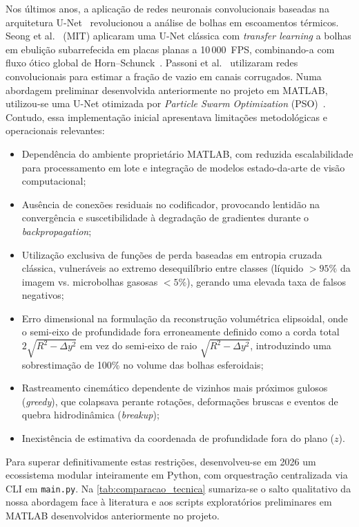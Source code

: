 Nos últimos anos, a aplicação de redes neuronais convolucionais baseadas na arquitetura U-Net~\cite{ronneberger2015unet} revolucionou a análise de bolhas em escoamentos térmicos. Seong et al.~\cite{seong2023automated} (MIT) aplicaram uma U-Net clássica com \emph{transfer learning} a bolhas em ebulição subarrefecida em placas planas a 10\,000~FPS, combinando-a com fluxo ótico global de Horn--Schunck~\cite{hornschunck1981}. Passoni et al.~\cite{passoni2024integrating} utilizaram redes convolucionais para estimar a fração de vazio em canais corrugados. Numa abordagem preliminar desenvolvida anteriormente no projeto em MATLAB, utilizou-se uma U-Net otimizada por \emph{Particle Swarm Optimization} (PSO)~\cite{kennedy1995particle}. Contudo, essa implementação inicial apresentava limitações metodológicas e operacionais relevantes:
\begin{itemize}
    \item Dependência do ambiente proprietário MATLAB, com reduzida escalabilidade para processamento em lote e integração de modelos estado-da-arte de visão computacional;
    \item Ausência de conexões residuais no codificador, provocando lentidão na convergência e suscetibilidade à degradação de gradientes durante o \emph{backpropagation};
    \item Utilização exclusiva de funções de perda baseadas em entropia cruzada clássica, vulneráveis ao extremo desequilíbrio entre classes (líquido $>95\%$ da imagem vs. microbolhas gasosas $<5\%$), gerando uma elevada taxa de falsos negativos;
    \item Erro dimensional na formulação da reconstrução volumétrica elipsoidal, onde o semi-eixo de profundidade fora erroneamente definido como a corda total $2\sqrt{R^2-\Delta y^2}$ em vez do semi-eixo de raio $\sqrt{R^2-\Delta y^2}$, introduzindo uma sobrestimação de 100\% no volume das bolhas esferoidais;
    \item Rastreamento cinemático dependente de vizinhos mais próximos gulosos (\emph{greedy}), que colapsava perante rotações, deformações bruscas e eventos de quebra hidrodinâmica (\emph{breakup});
    \item Inexistência de estimativa da coordenada de profundidade fora do plano ($z$).
\end{itemize}

Para superar definitivamente estas restrições, desenvolveu-se em 2026 um ecossistema modular inteiramente em Python, com orquestração centralizada via CLI em \texttt{main.py}. Na \autoref{tab:comparacao_tecnica} sumariza-se o salto qualitativo da nossa abordagem face à literatura e aos scripts exploratórios preliminares em MATLAB desenvolvidos anteriormente no projeto.

